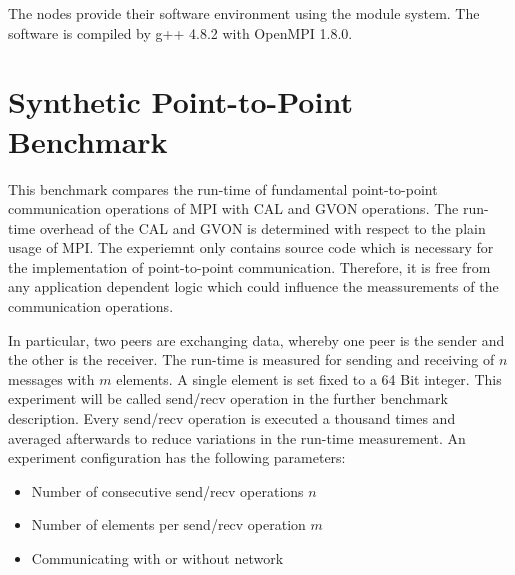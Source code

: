 

The nodes provide their software environment using the module system.
The software is compiled by g++ 4.8.2 with OpenMPI 1.8.0.

\section{Synthetic Point-to-Point Benchmark}
This benchmark compares the run-time of fundamental point-to-point
communication operations of MPI with CAL and GVON operations.  The
run-time overhead of the CAL and GVON is determined with respect to
the plain usage of MPI.  The experiemnt only contains source code
which is necessary for the implementation of point-to-point
communication. Therefore, it is free from any application dependent
logic which could influence the meassurements of the communication
operations.

In particular, two peers are exchanging data, whereby one peer is the
sender and the other is the receiver. The run-time is measured for
sending and receiving of $n$ messages with $m$ elements.  A single
element is set fixed to a 64 Bit integer.  This experiment will be
called send/recv operation in the further benchmark description. Every
send/recv operation is executed a thousand times and averaged
afterwards to reduce variations in the run-time measurement. An
experiment configuration has the following parameters:

\begin{itemize}
  \item Number of consecutive send/recv operations $n$
  \item Number of elements per send/recv operation $m$
  \item Communicating with or without network
\end{itemize}

